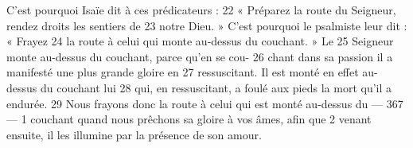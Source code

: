 C'est pourquoi Isaïe dit à ces prédicateurs :	 
22	 	« Préparez la route du Seigneur, rendez droits les sentiers de	 
23	 	notre Dieu. » C'est pourquoi le psalmiste leur dit : « Frayez	 
24	 	la route à celui qui monte au-dessus du couchant. » Le	 
25	 	Seigneur monte au-dessus du couchant, parce qu'en se cou-	 
26	 	chant dans sa passion il a manifesté une plus grande gloire en	 
27	 	ressuscitant. Il est monté en effet au-dessus du couchant lui	 
28	 	qui, en ressuscitant, a foulé aux pieds la mort qu'il a endurée.	 
29	 	Nous frayons donc la route à celui qui est monté au-dessus du	 
 	--- 367 ---	 
1	 	couchant quand nous prêchons sa gloire à vos âmes, afin que	 
2	 	venant ensuite, il les illumine par la présence de son amour.